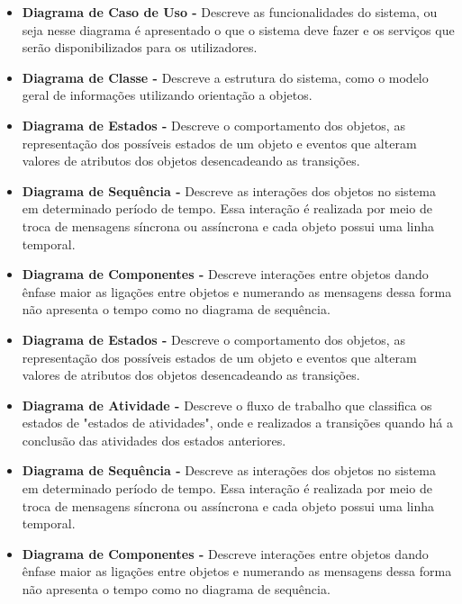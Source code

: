     \begin{itemize}
        \item \textbf{Diagrama de Caso de Uso -}
        Descreve as funcionalidades do sistema, ou seja nesse diagrama é apresentado o que o sistema deve fazer e os serviços que serão disponibilizados para os utilizadores. 
% 
       \item \textbf{Diagrama de Classe -}
       Descreve a estrutura do sistema, como o modelo geral de informações utilizando orientação a objetos.
                
        \item \textbf{Diagrama de Estados -}
        Descreve o comportamento dos objetos, as representação dos possíveis estados de um objeto e eventos que alteram valores de atributos dos objetos desencadeando as transições.
        
        \item \textbf{Diagrama de Sequência -}
        Descreve as interações dos objetos no sistema em determinado período de tempo. Essa interação é realizada por meio de troca de mensagens síncrona ou assíncrona e cada objeto possui uma linha temporal.
        
        \item \textbf{Diagrama de Componentes -}
        Descreve interações entre objetos dando ênfase maior as ligações entre objetos e numerando as mensagens dessa forma não apresenta o tempo como no diagrama de sequência.
        
        \item \textbf{Diagrama de Estados -}
        Descreve o comportamento dos objetos, as representação dos possíveis estados de um objeto e eventos que alteram valores de atributos dos objetos desencadeando as transições.
        
        \item \textbf{Diagrama de Atividade -}
        Descreve o fluxo de trabalho que classifica os estados de "estados de atividades", onde e realizados a transições quando há a conclusão das atividades dos estados anteriores.
        
        \item \textbf{Diagrama de Sequência -}
        Descreve as interações dos objetos no sistema em determinado período de tempo. Essa interação é realizada por meio de troca de mensagens síncrona ou assíncrona e cada objeto possui uma linha temporal.
        
        \item \textbf{Diagrama de Componentes -}
        Descreve interações entre objetos dando ênfase maior as ligações entre objetos e numerando as mensagens dessa forma não apresenta o tempo como no diagrama de sequência.

    \end{itemize}

